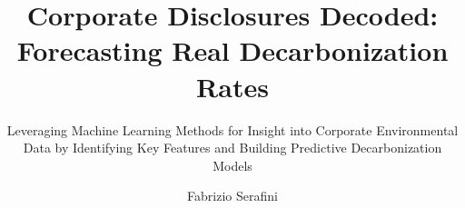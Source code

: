 \title{Corporate Disclosures Decoded: Forecasting Real Decarbonization Rates}
\subtitle{Leveraging Machine Learning Methods for Insight into Corporate Environmental Data by Identifying Key Features and Building Predictive Decarbonization Models}
\author{Fabrizio Serafini}


